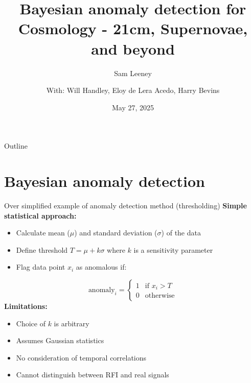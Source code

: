 \documentclass[aspectratio=169]{beamer}
\title{Bayesian anomaly detection for Cosmology - 21cm, Supernovae, and beyond}
\subtitle{Sam Leeney}
\date{May 27, 2025}
\author{With: Will Handley, Eloy de Lera Acedo, Harry Bevins}
\institute{} %
\begin{document}
\begin{frame}
  \titlepage
\end{frame}

\begin{frame}{Outline}
  \tableofcontents[hideallsubsections]
\end{frame}


\section{Bayesian anomaly detection}

\begin{frame}{Over simplified example of anomaly detection method (thresholding)}
  \footnotesize
  \textbf{Simple statistical approach:}
  \begin{itemize}
    \item Calculate mean ($\mu$) and standard deviation ($\sigma$) of the data
    \item Define threshold $T = \mu + k\sigma$ where $k$ is a sensitivity parameter
    \item Flag data point $x_i$ as anomalous if:
  \end{itemize}
  \begin{equation}
    \text{anomaly}_i = \begin{cases}
      1 & \text{if } x_i > T \\
      0 & \text{otherwise}
    \end{cases}
  \end{equation}
  \textbf{Limitations:}
  \begin{itemize}
    \item Choice of $k$ is arbitrary
    \item Assumes Gaussian statistics
    \item No consideration of temporal correlations
    \item Cannot distinguish between RFI and real signals
  \end{itemize}
\end{frame}
\end{document}
